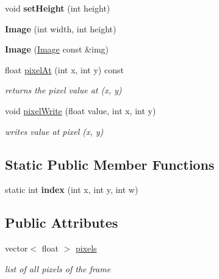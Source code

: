 \begin{DoxyCompactItemize}
\item 
\hypertarget{class_image_a031c156741deddb462c0c3cc0b7c1251}{void {\bfseries set\-Height} (int height)}\label{class_image_a031c156741deddb462c0c3cc0b7c1251}

\item 
\hypertarget{class_image_afb0339b802ed560e69eb07358d30198f}{{\bfseries Image} (int width, int height)}\label{class_image_afb0339b802ed560e69eb07358d30198f}

\item 
\hypertarget{class_image_a11c4da10d93cb19f684f5dbec08e564d}{{\bfseries Image} (\hyperlink{class_image}{Image} const \&img)}\label{class_image_a11c4da10d93cb19f684f5dbec08e564d}

\item 
\hypertarget{class_image_a9b183ad498d8ffea3f91a21e5a67920d}{float \hyperlink{class_image_a9b183ad498d8ffea3f91a21e5a67920d}{pixel\-At} (int x, int y) const }\label{class_image_a9b183ad498d8ffea3f91a21e5a67920d}

\begin{DoxyCompactList}\small\item\em returns the pixel value at (x, y) \end{DoxyCompactList}\item 
\hypertarget{class_image_afcd6f049060759d996f08b335ef2351d}{void \hyperlink{class_image_afcd6f049060759d996f08b335ef2351d}{pixel\-Write} (float value, int x, int y)}\label{class_image_afcd6f049060759d996f08b335ef2351d}

\begin{DoxyCompactList}\small\item\em writes value at pixel (x, y) \end{DoxyCompactList}\end{DoxyCompactItemize}
\subsection*{Static Public Member Functions}
\begin{DoxyCompactItemize}
\item 
\hypertarget{class_image_a990667d3006b26e839421d76cfb8d1d9}{static int {\bfseries index} (int x, int y, int w)}\label{class_image_a990667d3006b26e839421d76cfb8d1d9}

\end{DoxyCompactItemize}
\subsection*{Public Attributes}
\begin{DoxyCompactItemize}
\item 
\hypertarget{class_image_ac22dddb0c4b1136c745f0dce6db7a1dc}{vector$<$ float $>$ \hyperlink{class_image_ac22dddb0c4b1136c745f0dce6db7a1dc}{pixels}}\label{class_image_ac22dddb0c4b1136c745f0dce6db7a1dc}

\begin{DoxyCompactList}\small\item\em list of all pixels of the frame \end{DoxyCompactList}\end{DoxyCompactItemize}
